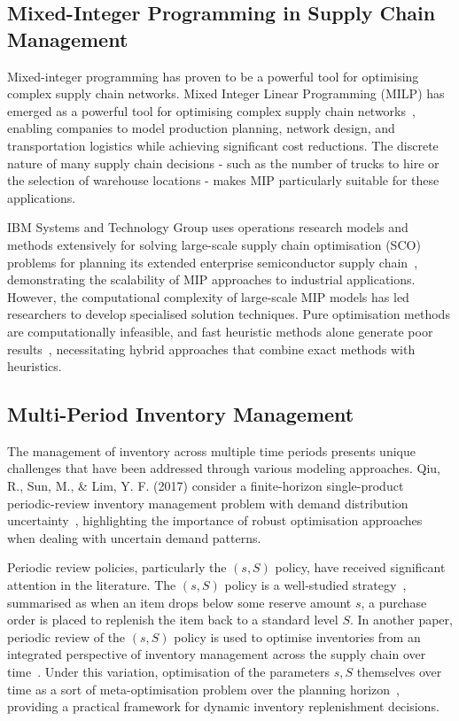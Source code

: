 \documentclass[a4paper,12pt]{article}
\begin{document}
\subsection{Mixed-Integer Programming in Supply Chain Management}\label{subsec:mixed-integer-programming-in-supply-chain-management}

Mixed-integer programming has proven to be a powerful tool for optimising complex supply chain networks.
Mixed Integer Linear Programming (MILP) has emerged as a powerful tool for optimising complex supply chain networks~\cite{researchgate2024optimizing}, enabling companies to model production planning, network design, and transportation logistics while achieving significant cost reductions.
The discrete nature of many supply chain decisions - such as the number of trucks to hire or the selection of warehouse locations - makes MIP particularly suitable for these applications.

IBM Systems and Technology Group uses operations research models and methods extensively for solving large-scale supply chain optimisation (SCO) problems for planning its extended enterprise semiconductor supply chain~\cite{denton2005methods}, demonstrating the scalability of MIP approaches to industrial applications.
However, the computational complexity of large-scale MIP models has led researchers to develop specialised solution techniques.
Pure optimisation methods are computationally infeasible, and fast heuristic methods alone generate poor results~\cite{denton2005methods}, necessitating hybrid approaches that combine exact methods with heuristics.

\subsection{Multi-Period Inventory Management}\label{subsec:multi-period-inventory-management}

The management of inventory across multiple time periods presents unique challenges that have been addressed through various modeling approaches.
Qiu, R., Sun, M., \& Lim, Y. F. (2017) consider a finite-horizon single-product periodic-review inventory management problem with demand distribution uncertainty~\cite{qiu2017optimizing}, highlighting the importance of robust optimisation approaches when dealing with uncertain demand patterns.

Periodic review policies, particularly the $(s,S)$ policy, have received significant attention in the literature.
The $(s, S)$ policy is a well-studied strategy~\cite{zheng1991}, summarised as when an item drops below some reserve amount $s$, a purchase order is placed to replenish the item back to a standard level $S$.
In another paper, periodic review of the $(s,S)$ policy is used to optimise inventories from an integrated perspective of inventory management across the supply chain over time~\cite{mdpi2025inventory}.
Under this variation, optimisation of the parameters $s, S$ themselves over time as a sort of meta-optimisation problem over the planning horizon~\cite{mdpi2025inventory}, providing a practical framework for dynamic inventory replenishment decisions.
\end{document}
